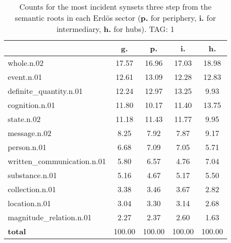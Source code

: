 \begin{table}[h!]
\begin{center}
\begin{tabular}{| l | c | c | c | c |}\hline
 & g. & p. & i. & h. \\\hline
whole.n.02 & 17.57  & 16.96  & 17.03  & 18.98 \\\hline
event.n.01 & 12.61  & 13.09  & 12.28  & 12.83 \\\hline
definite\_quantity.n.01 & 12.24  & 12.97  & 13.25  & 9.93 \\\hline
cognition.n.01 & 11.80  & 10.17  & 11.40  & 13.75 \\\hline
state.n.02 & 11.18  & 11.43  & 11.77  & 9.95 \\\hline
message.n.02 & 8.25  & 7.92  & 7.87  & 9.17 \\\hline
person.n.01 & 6.68  & 7.09  & 7.05  & 5.71 \\\hline
written\_communication.n.01 & 5.80  & 6.57  & 4.76  & 7.04 \\\hline
substance.n.01 & 5.16  & 4.67  & 5.17  & 5.50 \\\hline
collection.n.01 & 3.38  & 3.46  & 3.67  & 2.82 \\\hline
location.n.01 & 3.04  & 3.30  & 3.14  & 2.68 \\\hline
magnitude\_relation.n.01 & 2.27  & 2.37  & 2.60  & 1.63 \\\hline
{{\bf total}} & 100.00  & 100.00  & 100.00  & 100.00 \\\hline
\end{tabular}
\caption{Counts for the most incident synsets three step from the semantic roots in each Erd\"os sector ({\bf p.} for periphery, {\bf i.} for intermediary, {\bf h.} for hubs). TAG: 1}
\end{center}
\end{table}